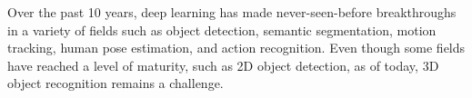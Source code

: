 Over the past 10 years, deep learning has made never-seen-before breakthroughs in a variety of fields such as object detection, semantic segmentation, motion tracking, human pose estimation, and action recognition. Even though some fields have reached a level of maturity, such as 2D object detection, as of today, 3D object recognition remains a challenge.

  




